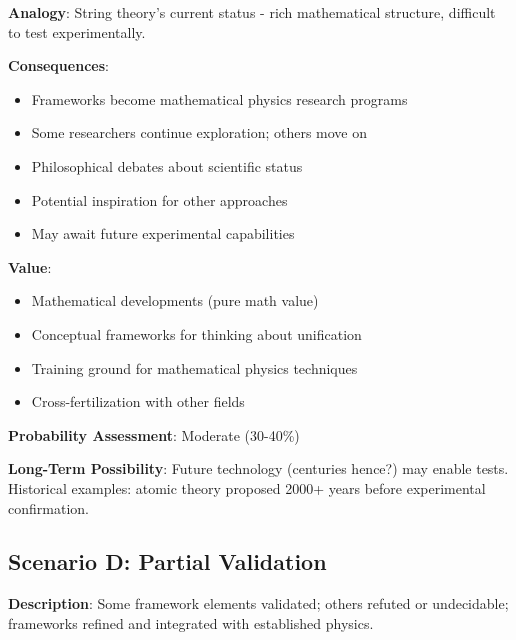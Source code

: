 \textbf{Analogy}: String theory's current status - rich mathematical structure, difficult to test experimentally.

\textbf{Consequences}:
\begin{itemize}
    \item Frameworks become mathematical physics research programs
    \item Some researchers continue exploration; others move on
    \item Philosophical debates about scientific status
    \item Potential inspiration for other approaches
    \item May await future experimental capabilities
\end{itemize}

\textbf{Value}:
\begin{itemize}
    \item Mathematical developments (pure math value)
    \item Conceptual frameworks for thinking about unification
    \item Training ground for mathematical physics techniques
    \item Cross-fertilization with other fields
\end{itemize}

\textbf{Probability Assessment}: Moderate (30-40\%)

\textbf{Long-Term Possibility}: Future technology (centuries hence?) may enable tests. Historical examples: atomic theory proposed 2000+ years before experimental confirmation.

\subsection{Scenario D: Partial Validation}

\textbf{Description}: Some framework elements validated; others refuted or undecidable; frameworks refined and integrated with established physics.

